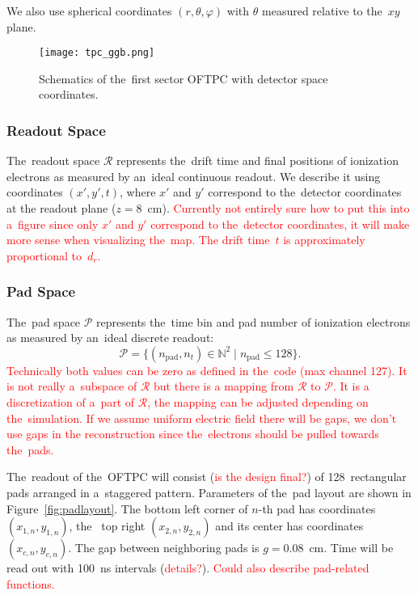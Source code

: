 				We also use spherical coordinates $(r,\theta,\varphi)$ with $\theta$ measured relative to the~$xy$ plane.
				
				\begin{figure}
					\centering
					\texttt{[image: tpc\_ggb.png]}
					\caption{Schematics of the~first sector \ac{OFTPC} with detector space coordinates.}
					\label{fig:oftpc}
				\end{figure}
			
			\subsubsection{Readout Space}
				The~readout space $\mathcal{R}$ represents the~drift time and final positions of ionization electrons as measured by an~ideal continuous readout. We describe it using coordinates $(x',y',t)$, where $x'$ and $y'$ correspond to the~detector coordinates at the readout plane ($z = 8$~cm). \textcolor{red}{Currently not entirely sure how to put this into a~figure since only $x'$ and $y'$ correspond to the~detector coordinates, it will make more sense when visualizing the~map. The drift time~$t$ is approximately proportional to~$d_r$.}
			
			\subsubsection{Pad Space}
				The~pad space $\mathcal{P}$ represents the~time bin and pad number of ionization electrons as measured by an~ideal discrete readout:
					\begin{equation}
						\mathcal{P} = \{(n_\text{pad},n_t)\in\mathbb{N}^2 \mid n_\text{pad}\leq128\}.
					\end{equation}
				\textcolor{red}{Technically both values can be zero as defined in the~code (max channel 127). It is not really a~subspace of $\mathcal{R}$ but there is a mapping from $\mathcal{R}$ to $\mathcal{P}$. It is a discretization of a~part of $\mathcal{R}$, the mapping can be adjusted depending on the~simulation. If we assume uniform electric field there will be gaps, we don't use gaps in the reconstruction since the~electrons should be pulled towards the~pads.}
				
			The~readout of the~\ac{OFTPC} will consist (\textcolor{red}{is the design final?}) of 128~rectangular pads arranged in a~staggered pattern. Parameters of the~pad layout are shown in Figure~\ref{fig:padlayout}. The bottom left corner of $n$\nobreakdash-th pad has coordinates $(x_{1,n},y_{1,n})$, the~ top right $(x_{2,n},y_{2,n})$ and its center has coordinates $(x_{c,n},y_{c,n})$. The gap between neighboring pads is $g=0.08$~cm. Time will be read out with 100~ns intervals (\textcolor{red}{details?}). \textcolor{red}{Could also describe pad-related functions.}
			
